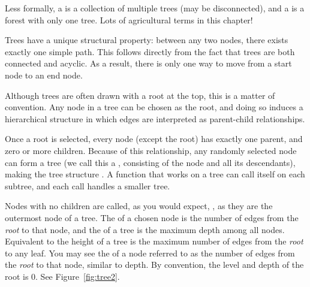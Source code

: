Less formally, a  is a collection of multiple trees (may be disconnected), and a  is a forest with only one tree. Lots of agricultural terms in this chapter!

Trees have a unique structural property: between any two nodes, there exists exactly one simple path. This follows directly from the fact that trees are both connected and acyclic. As a result, there is only one way to move from a start node to an end node.

Although trees are often drawn with a root at the top, this is a matter of convention. Any node in a tree can be chosen as the root, and doing so induces a hierarchical structure in which edges are interpreted as parent-child relationships.

Once a root is selected, every node (except the root) has exactly one parent, and zero or more children. Because of this relationship, any randomly selected node can form a tree (we call this a , consisting of the node and all its descendants), making the tree structure . A function that works on a tree can call itself on each subtree, and each call handles a smaller tree.

Nodes with no children are called, as you would expect, , as they are the outermost node of a tree. The  of a chosen node is the number of edges from the \emph{root} to that node, and the  of a tree is the maximum depth among all nodes. Equivalent to the height of a tree is the maximum number of edges from the \emph{root} to any leaf. You may see the  of a node referred to as the number of edges from the \emph{root} to that node, similar to depth. By convention, the level and depth of the root is 0. See Figure~\ref{fig:tree2}.

